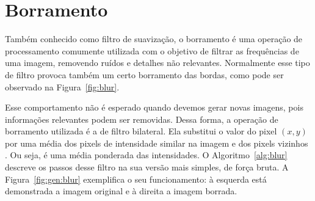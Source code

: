 
%

\section{Borramento}

Também conhecido como filtro de suavização, o borramento é uma operação de processamento comumente utilizada com o objetivo de filtrar as frequências de uma imagem, removendo ruídos e detalhes não relevantes. Normalmente esse tipo de filtro provoca também um certo borramento das bordas, como pode ser observado na Figura~\ref{fig:blur}.

Esse comportamento não é esperado quando devemos gerar novas imagens, pois informações relevantes podem ser removidas. Dessa forma, a operação de borramento utilizada é a de filtro bilateral. Ela substitui o valor do pixel $(x,y)$ por uma média dos pixels de intensidade similar na imagem e dos pixels vizinhos \cite{Tomasi1998}. Ou seja, é uma média ponderada das intensidades. O Algoritmo~\ref{alg:blur} descreve os passos desse filtro na sua versão mais simples, de força bruta. A Figura~\ref{fig:gen:blur} exemplifica o seu funcionamento: à esquerda está demonstrada a imagem original e à direita a imagem borrada.

